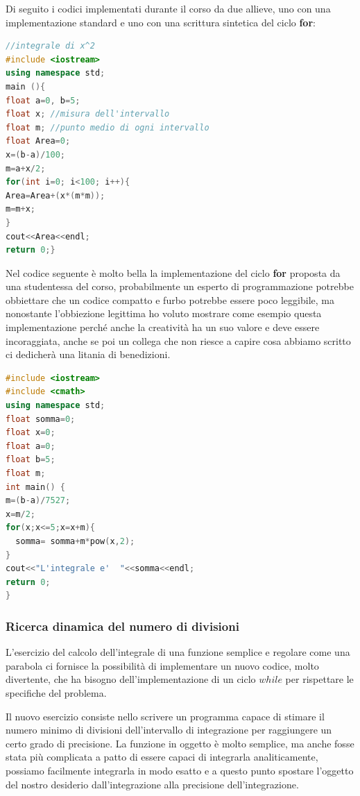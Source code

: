 \documentclass[11pt,fleqn]{book} %
\begin{document}
Di seguito i codici implementati durante il corso da due allieve,
uno con una implementazione standard e uno con una scrittura sintetica del ciclo \textbf{for}:

\begin{lstlisting}[language=c++]
//integrale di x^2
#include <iostream>
using namespace std;
main (){
float a=0, b=5;
float x; //misura dell'intervallo
float m; //punto medio di ogni intervallo
float Area=0;
x=(b-a)/100;
m=a+x/2;
for(int i=0; i<100; i++){
Area=Area+(x*(m*m));
m=m+x;
}
cout<<Area<<endl;
return 0;}
\end{lstlisting}

Nel codice seguente è molto bella la implementazione del ciclo \textbf{for} proposta da una studentessa del corso, probabilmente un esperto di programmazione potrebbe obbiettare che un codice compatto e furbo potrebbe essere poco leggibile, ma nonostante l'obbiezione legittima ho voluto mostrare come esempio questa implementazione perché anche la creatività ha un suo valore e deve essere incoraggiata, anche se poi un collega che non riesce a capire cosa abbiamo scritto ci dedicherà una litania di benedizioni.

\begin{lstlisting}[language=c++]
#include <iostream>
#include <cmath>
using namespace std;
float somma=0;
float x=0;
float a=0;
float b=5;
float m;
int main() {
m=(b-a)/7527;
x=m/2;
for(x;x<=5;x=x+m){
  somma= somma+m*pow(x,2);
}
cout<<"L'integrale e'  "<<somma<<endl;
return 0;
}
\end{lstlisting}

\subsubsection{Ricerca dinamica del numero di divisioni}

L'esercizio del calcolo dell'integrale di una funzione semplice e regolare come una parabola ci fornisce la possibilità di implementare un nuovo codice, molto divertente, che ha bisogno dell'implementazione di un ciclo $while$ per rispettare le specifiche del problema.

Il nuovo esercizio consiste nello scrivere un programma capace di stimare il numero minimo di divisioni dell'intervallo di integrazione per raggiungere un certo grado di precisione. La funzione in oggetto è molto semplice, ma anche fosse stata più complicata a patto di essere capaci di integrarla analiticamente, possiamo facilmente integrarla in modo esatto e a questo punto spostare l'oggetto del nostro desiderio dall'integrazione alla precisione dell'integrazione. 
\end{document}
